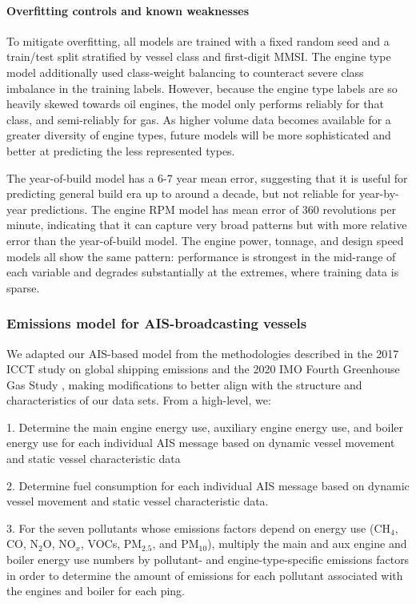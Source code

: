 \documentclass[lineno,pdflatex,sn-nature]{sn-jnl}
\begin{document}
\paragraph{Overfitting controls and known weaknesses}
To mitigate overfitting, all models are trained with a fixed random seed and a train/test split stratified by vessel class and first-digit MMSI. The engine type model additionally used class-weight balancing to counteract severe class imbalance in the training labels. However, because the engine type labels are so heavily skewed towards oil engines, the model only performs reliably for that class, and semi-reliably for gas. As higher volume data becomes available for a greater diversity of engine types, future models will be more sophisticated and better at predicting the less represented types. 

The year-of-build model has a 6-7 year mean error, suggesting that it is useful for predicting general build era up to around a decade, but not reliable for year-by-year predictions. The engine RPM model has mean error of 360 revolutions per minute, indicating that it can capture very broad patterns but with more relative error than the year-of-build model.
The engine power, tonnage, and design speed models all show the same pattern: performance is strongest in the mid-range of each variable and degrades substantially at the extremes, where training data is sparse.

\subsubsection{Emissions model for AIS-broadcasting vessels}

We adapted our AIS-based model from the methodologies described in the 2017 ICCT study on global shipping emissions \cite{olmer2017greenhouse} and the 2020 IMO Fourth Greenhouse Gas Study \cite{fourth2020greenhouse}, making modifications to better align with the structure and characteristics of our data sets. From a high-level, we: 

1. Determine the main engine energy use, auxiliary engine energy use, and boiler energy use for each individual AIS message based on dynamic vessel movement and static vessel characteristic data

2. Determine fuel consumption for each individual AIS message based on dynamic vessel movement and static vessel characteristic data.

3. For the seven pollutants whose emissions factors depend on energy use (CH$_{4}$, CO, N$_{2}$O, NO$_{x}$, VOCs, PM$_{2.5}$, and PM$_{10}$), multiply the main and aux engine and boiler energy use numbers by pollutant- and engine-type-specific emissions factors in order to determine the amount of emissions for each pollutant associated with the engines and boiler for each ping.
\end{document}

